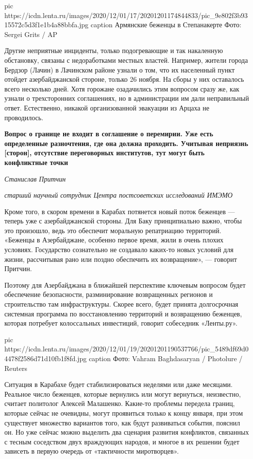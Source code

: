 \ifcmt
pic https://icdn.lenta.ru/images/2020/12/01/17/20201201174844833/pic_9e802f3b9315572c5d3f1e1b4a88bbfa.jpg
caption Армянские беженцы в Степанакерте Фото: Sergei Grits / AP
\fi

Другие неприятные инциденты, только подогревающие и так накаленную обстановку,
связаны с недоработками местных властей. Например, жители города Бердзор
(Лачин) в Лачинском районе узнали о том, что их населенный пункт отойдет
азербайджанской стороне, только 26 ноября. На сборы у них оставалось всего
несколько дней. Хотя горожане озадачились этим вопросом сразу же, как узнали о
трехсторонних соглашениях, но в администрации им дали неправильный ответ.
Естественно, никакой организованной эвакуации из Арцаха не проводилось.

\begin{leftbar}
	\bfseries
Вопрос о границе не входит в соглашение о перемирии. Уже есть определенные
разночтения, где она должна проходить. Учитывая неприязнь [сторон], отсутствие
переговорных институтов, тут могут быть конфликтные точки\par
				\emph{Станислав Притчин}\par
				\emph{старший научный сотрудник Центра постсоветских исследований ИМЭМО}
\end{leftbar}

Кроме того, в скором времени в Карабах потянется новый поток беженцев --- теперь
уже с азербайджанской стороны. Для Баку принципиально важно, чтобы это
произошло, ведь это обеспечит моральную репатриацию территорий. «Беженцы в
Азербайджане, особенно первое время, жили в очень плохих условиях. Государство
сознательно не создавало каких-то новых условий для жизни, рассчитывая рано или
поздно обеспечить их возвращение», --- говорит Притчин.

Поэтому для Азербайджана в ближайшей перспективе ключевым вопросом будет
обеспечение безопасности, разминирование возвращенных регионов и строительство
там инфраструктуры. Скорее всего, будет принята долгосрочная системная
программа по восстановлению территорий и возвращению беженцев, которая
потребует колоссальных инвестиций, говорит собеседник «Ленты.ру».

\ifcmt
pic https://icdn.lenta.ru/images/2020/12/01/19/20201201190537766/pic_5489df69d04478f2586d71d10fb1f8fd.jpg
caption Фото: Vahram Baghdasaryan / Photolure / Reuters
\fi

Ситуация в Карабахе будет стабилизироваться неделями или даже месяцами.
Реальное число беженцев, которые вернулись или могут вернуться, неизвестно,
считает политолог Алексей Малашенко. Какие-то проблемы передела границ, которые
сейчас не очевидны, могут проявиться только к концу января, при этом существует
множество вариантов того, как будут развиваться события, пояснил он. Но уже
сейчас можно выделить два сценария развития конфликтов, связанных с тесным
соседством двух враждующих народов, и многое в их решении будет зависеть в
первую очередь от «тактичности миротворцев».

